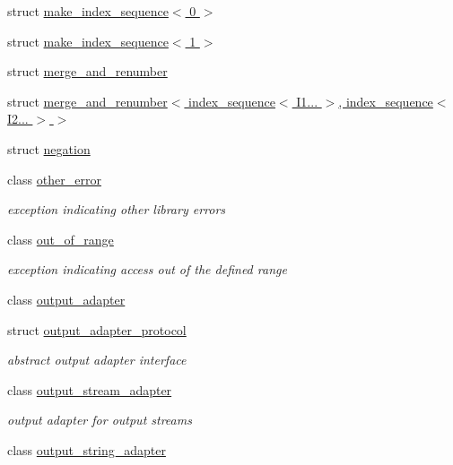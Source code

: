 \begin{DoxyCompactItemize}
\item 
struct \hyperlink{structnlohmann_1_1detail_1_1make__index__sequence_3_010_01_4}{make\+\_\+index\+\_\+sequence$<$ 0 $>$}
\item 
struct \hyperlink{structnlohmann_1_1detail_1_1make__index__sequence_3_011_01_4}{make\+\_\+index\+\_\+sequence$<$ 1 $>$}
\item 
struct \hyperlink{structnlohmann_1_1detail_1_1merge__and__renumber}{merge\+\_\+and\+\_\+renumber}
\item 
struct \hyperlink{structnlohmann_1_1detail_1_1merge__and__renumber_3_01index__sequence_3_01_i1_8_8_8_01_4_00_01indf5ec8c9c7b5107e4b381e3ca4c1be2ca}{merge\+\_\+and\+\_\+renumber$<$ index\+\_\+sequence$<$ I1... $>$, index\+\_\+sequence$<$ I2... $>$ $>$}
\item 
struct \hyperlink{structnlohmann_1_1detail_1_1negation}{negation}
\item 
class \hyperlink{classnlohmann_1_1detail_1_1other__error}{other\+\_\+error}
\begin{DoxyCompactList}\small\item\em exception indicating other library errors \end{DoxyCompactList}\item 
class \hyperlink{classnlohmann_1_1detail_1_1out__of__range}{out\+\_\+of\+\_\+range}
\begin{DoxyCompactList}\small\item\em exception indicating access out of the defined range \end{DoxyCompactList}\item 
class \hyperlink{classnlohmann_1_1detail_1_1output__adapter}{output\+\_\+adapter}
\item 
struct \hyperlink{structnlohmann_1_1detail_1_1output__adapter__protocol}{output\+\_\+adapter\+\_\+protocol}
\begin{DoxyCompactList}\small\item\em abstract output adapter interface \end{DoxyCompactList}\item 
class \hyperlink{classnlohmann_1_1detail_1_1output__stream__adapter}{output\+\_\+stream\+\_\+adapter}
\begin{DoxyCompactList}\small\item\em output adapter for output streams \end{DoxyCompactList}\item 
class \hyperlink{classnlohmann_1_1detail_1_1output__string__adapter}{output\+\_\+string\+\_\+adapter}

\end{DoxyCompactItemize}
